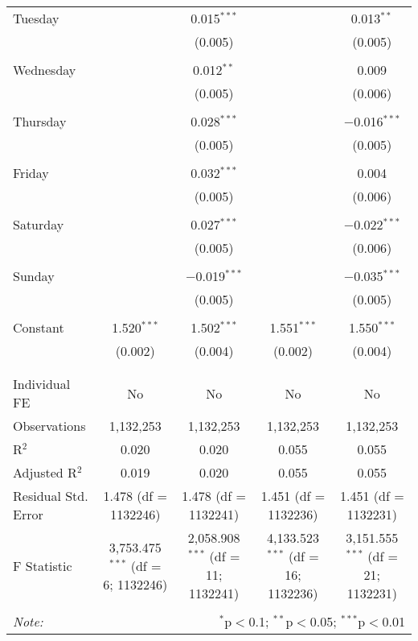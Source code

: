 \documentclass[
]{article}
\begin{document}
\begin{table}[!htbp]
{\begin{tabular}{@{\extracolsep{5pt}}lcccc}
 Tuesday &  & 0.015$^{***}$ &  & 0.013$^{**}$ \\ 
  &  & (0.005) &  & (0.005) \\ 
  & & & & \\ 
 Wednesday &  & 0.012$^{**}$ &  & 0.009 \\ 
  &  & (0.005) &  & (0.006) \\ 
  & & & & \\ 
 Thursday &  & 0.028$^{***}$ &  & $-$0.016$^{***}$ \\ 
  &  & (0.005) &  & (0.005) \\ 
  & & & & \\ 
 Friday &  & 0.032$^{***}$ &  & 0.004 \\ 
  &  & (0.005) &  & (0.006) \\ 
  & & & & \\ 
 Saturday &  & 0.027$^{***}$ &  & $-$0.022$^{***}$ \\ 
  &  & (0.005) &  & (0.006) \\ 
  & & & & \\ 
 Sunday &  & $-$0.019$^{***}$ &  & $-$0.035$^{***}$ \\ 
  &  & (0.005) &  & (0.005) \\ 
  & & & & \\ 
 Constant & 1.520$^{***}$ & 1.502$^{***}$ & 1.551$^{***}$ & 1.550$^{***}$ \\ 
  & (0.002) & (0.004) & (0.002) & (0.004) \\ 
  & & & & \\ 
\hline \\[-1.8ex] 
Individual FE & No & No & No & No \\ 
Observations & 1,132,253 & 1,132,253 & 1,132,253 & 1,132,253 \\ 
R$^{2}$ & 0.020 & 0.020 & 0.055 & 0.055 \\ 
Adjusted R$^{2}$ & 0.019 & 0.020 & 0.055 & 0.055 \\ 
Residual Std. Error & 1.478 (df = 1132246) & 1.478 (df = 1132241) & 1.451 (df = 1132236) & 1.451 (df = 1132231) \\ 
F Statistic & 3,753.475$^{***}$ (df = 6; 1132246) & 2,058.908$^{***}$ (df = 11; 1132241) & 4,133.523$^{***}$ (df = 16; 1132236) & 3,151.555$^{***}$ (df = 21; 1132231) \\ 
\hline 
\hline \\[-1.8ex] 
\textit{Note:}  & \multicolumn{4}{r}{$^{*}$p$<$0.1; $^{**}$p$<$0.05; $^{***}$p$<$0.01} \\ 
\end{tabular}
} 
\end{table} 
\newpage
\end{document}
